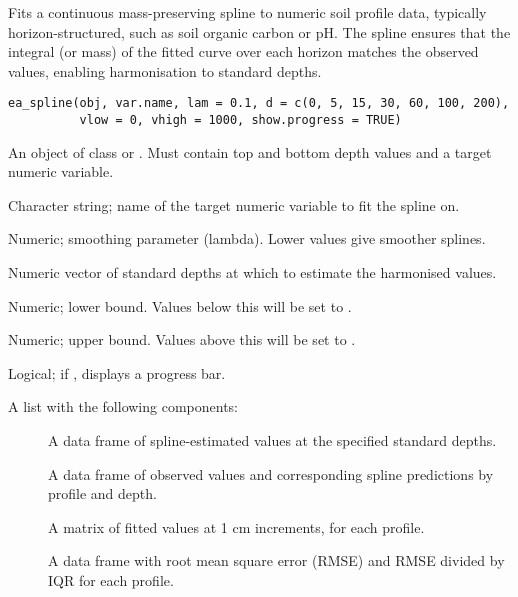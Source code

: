 \documentclass[a4paper]{book}
\begin{document}
%
\begin{Description}
Fits a continuous mass-preserving spline to numeric soil profile data, typically horizon-structured, such as soil organic carbon or pH. The spline ensures that the integral (or mass) of the fitted curve over each horizon matches the observed values, enabling harmonisation to standard depths.
\end{Description}
%
\begin{Usage}
\begin{verbatim}
ea_spline(obj, var.name, lam = 0.1, d = c(0, 5, 15, 30, 60, 100, 200),
          vlow = 0, vhigh = 1000, show.progress = TRUE)
\end{verbatim}
\end{Usage}
%
\begin{Arguments}
\begin{ldescription}
\item[\code{obj}] An object of class  or . Must contain top and bottom depth values and a target numeric variable.
\item[\code{var.name}] Character string; name of the target numeric variable to fit the spline on.
\item[\code{lam}] Numeric; smoothing parameter (lambda). Lower values give smoother splines.
\item[\code{d}] Numeric vector of standard depths at which to estimate the harmonised values.
\item[\code{vlow}] Numeric; lower bound. Values below this will be set to .
\item[\code{vhigh}] Numeric; upper bound. Values above this will be set to .
\item[\code{show.progress}] Logical; if , displays a progress bar.
\end{ldescription}
\end{Arguments}
%
\begin{Value}
A list with the following components:
\begin{description}

\item[] A data frame of spline-estimated values at the specified standard depths.
\item[] A data frame of observed values and corresponding spline predictions by profile and depth.
\item[] A matrix of fitted values at 1 cm increments, for each profile.
\item[] A data frame with root mean square error (RMSE) and RMSE divided by IQR for each profile.

\end{description}

\end{Value}
\end{document}
